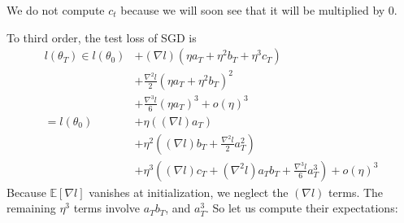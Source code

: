\documentclass{article}
\theoremstyle{plain}
\theoremstyle{definition}
\newcommand{\expct}[1]{\mathbb{E}\left[#1\right]}
\newcommand{\wrap}[1]{\left(#1\right)}
\begin{document}
            We do not compute $c_t$ because we will soon see that it will be
            multiplied by $0$.

            To third order, the test loss of SGD is
            \begin{align*}
                l(\theta_T)
                \in
                        l(\theta_0)
                &+     (\nabla   l)   (\eta a_T + \eta^2 b_T + \eta^3 c_T)                              \\
                &+\frac{\nabla^2 l}{2}(\eta a_T + \eta^2 b_T             )^2                            \\
                &+\frac{\nabla^3 l}{6}(\eta a_T                          )^3 
                 +o(\eta)^3                                                                             \\
                =
                    l(\theta_0)
                &+  \eta       \wrap{(\nabla l) a_T                               }                     \\
                &+  \eta^2     \wrap{(\nabla l) b_T + \frac{\nabla^2 l}{2} a_T^2  }                     \\
                &+  \eta^3     \wrap{(\nabla l) c_T + (\nabla^2 l) a_T b_T + \frac{\nabla^3 l}{6} a_T^3}
                 +o(\eta)^3                                                                             
            \end{align*}
            Because $\expct{\nabla l}$ vanishes at initialization, we neglect
            the $(\nabla l)$ terms.  The remaining $\eta^3$ terms involve
            $a_T b_T$, and $a_T^3$.  So let us
            compute their expectations:
\end{document}
